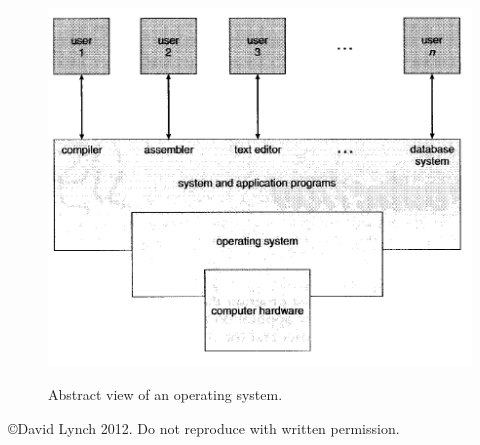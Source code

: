 \documentclass[10pt,a4paper]{article}
\begin{document}
\begin{figure}
\caption{Abstract view of an operating system. \cite{OSCONCEPTS}}
\begin{center}
\includegraphics[scale=0.45]{../images/operating-system.png}
\label{memory-h}
\end{center}
\end{figure}

{}

\begin{center}
{\small \copyright  David Lynch 2012. Do not reproduce with written permission.}
\end{center}
\end{document}
